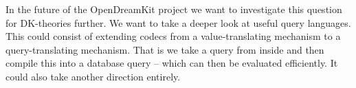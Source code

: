 In the future of the OpenDreamKit project we want to investigate this question for
DK-theories further. We want to take a deeper look at useful query languages. This could
consist of extending codecs from a value-translating mechanism to a query-translating
mechanism. That is we take a query from inside \MMT and then compile this into a database
query -- which can then be evaluated efficiently. It could also take another direction
entirely.

